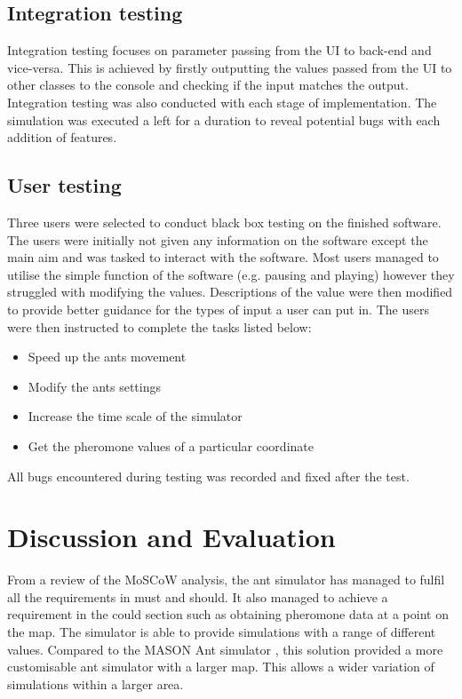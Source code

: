 \documentclass[a4paper, oneside, 11pt]{report}
\begin{document}
\section{Integration testing}
Integration testing focuses on parameter passing from the UI to back-end and vice-versa. This is achieved by firstly outputting the values passed from the UI to other classes to the console and checking if the input matches the output. Integration testing was also conducted with each stage of implementation. The simulation was executed a left for a duration to reveal potential bugs with each addition of features. 

\section{User testing}
Three users were selected to conduct black box testing on the finished software. The users were initially not given any information on the software except the main aim and was tasked to interact with the software. Most users managed to utilise the simple function of the software (e.g. pausing and playing) however they struggled with modifying the values. Descriptions of the value were then modified to provide better guidance for the types of input a user can put in. The users were then instructed to complete the tasks listed below:
\begin{itemize}
	\item Speed up the ants movement
	\item Modify the ants settings
	\item Increase the time scale of the simulator
	\item Get the pheromone values of a particular coordinate
\end{itemize} 
All bugs encountered during testing was recorded and fixed after the test.

\chapter{Discussion and Evaluation}
\label{chap:discussion}

From a review of the MoSCoW analysis, the ant simulator has managed to fulfil all the requirements in must and should. It also managed to achieve a requirement in the could section such as obtaining pheromone data at a point on the map. The simulator is able to provide simulations with a range of different values. Compared to the MASON Ant simulator \citep{Ant_Simulator}, this solution provided a more customisable ant simulator with a larger map. This allows a wider variation of simulations within a larger area.
\end{document}
